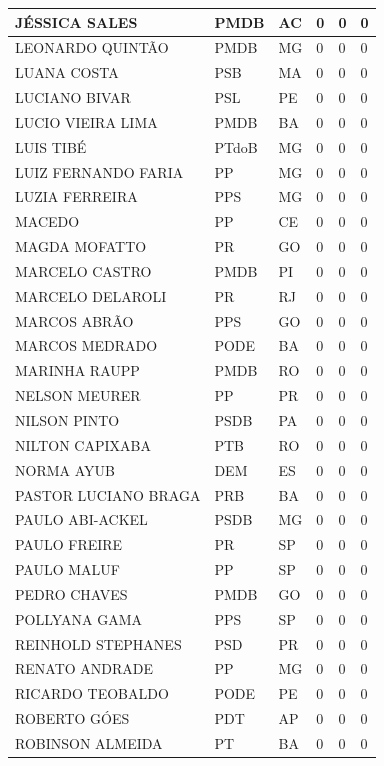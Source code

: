 \begin{apendicesenv}
\begin{longtable}{|L{4cm}|C{2cm}|C{1cm}|C{2cm}|C{1cm}|C{2cm}|}
JÉSSICA SALES & PMDB & AC & 0 & 0 & 0 \\ \hline
LEONARDO QUINTÃO & PMDB & MG & 0 & 0 & 0 \\ \hline
LUANA COSTA & PSB & MA & 0 & 0 & 0 \\ \hline
LUCIANO BIVAR & PSL & PE & 0 & 0 & 0 \\ \hline
LUCIO VIEIRA LIMA & PMDB & BA & 0 & 0 & 0 \\ \hline
LUIS TIBÉ & PTdoB & MG & 0 & 0 & 0 \\ \hline
LUIZ FERNANDO FARIA & PP & MG & 0 & 0 & 0 \\ \hline
LUZIA FERREIRA & PPS & MG & 0 & 0 & 0 \\ \hline
MACEDO & PP & CE & 0 & 0 & 0 \\ \hline
MAGDA MOFATTO & PR & GO & 0 & 0 & 0 \\ \hline
MARCELO CASTRO & PMDB & PI & 0 & 0 & 0 \\ \hline
MARCELO DELAROLI & PR & RJ & 0 & 0 & 0 \\ \hline
MARCOS ABRÃO & PPS & GO & 0 & 0 & 0 \\ \hline
MARCOS MEDRADO & PODE & BA & 0 & 0 & 0 \\ \hline
MARINHA RAUPP & PMDB & RO & 0 & 0 & 0 \\ \hline
NELSON MEURER & PP & PR & 0 & 0 & 0 \\ \hline
NILSON PINTO & PSDB & PA & 0 & 0 & 0 \\ \hline
NILTON CAPIXABA & PTB & RO & 0 & 0 & 0 \\ \hline
NORMA AYUB & DEM & ES & 0 & 0 & 0 \\ \hline
PASTOR LUCIANO BRAGA & PRB & BA & 0 & 0 & 0 \\ \hline
PAULO ABI-ACKEL & PSDB & MG & 0 & 0 & 0 \\ \hline
PAULO FREIRE & PR & SP & 0 & 0 & 0 \\ \hline
PAULO MALUF & PP & SP & 0 & 0 & 0 \\ \hline
PEDRO CHAVES & PMDB & GO & 0 & 0 & 0 \\ \hline
POLLYANA GAMA & PPS & SP & 0 & 0 & 0 \\ \hline
REINHOLD STEPHANES & PSD & PR & 0 & 0 & 0 \\ \hline
RENATO ANDRADE & PP & MG & 0 & 0 & 0 \\ \hline
RICARDO TEOBALDO & PODE & PE & 0 & 0 & 0 \\ \hline
ROBERTO GÓES & PDT & AP & 0 & 0 & 0 \\ \hline
ROBINSON ALMEIDA & PT & BA & 0 & 0 & 0 \\ \hline

\end{longtable}
\end{apendicesenv}
